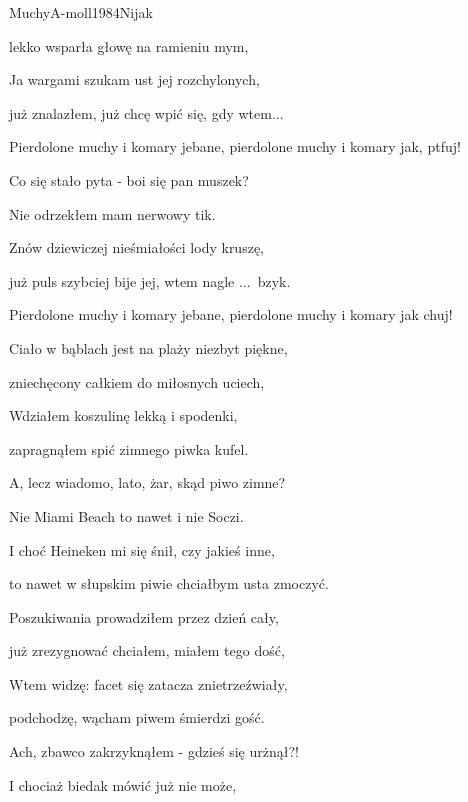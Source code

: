 \begin{song}{Muchy}{A-moll}{1984}{Nijak}{}{}
\begin{SBVerse}
	lekko wsparła głowę na ramieniu mym,

	Ja wargami szukam ust jej rozchylonych,

	już znalazłem, już chcę wpić się, gdy wtem...
	\end{SBVerse}

	\begin{SBChorus}
	Pierdolone muchy i komary jebane, pierdolone muchy i komary jak, ptfuj!
	\end{SBChorus}

	\begin{SBVerse}
	Co się stało pyta - boi się pan muszek?

	Nie odrzekłem mam nerwowy tik.

	Znów dziewiczej nieśmiałości lody kruszę,

	już puls szybciej bije jej, wtem nagle ...~bzyk.
	\end{SBVerse}

	\begin{SBChorus}
	Pierdolone muchy i komary jebane, pierdolone muchy i komary jak chuj!
	\end{SBChorus}

	\begin{SBVerse}
	Ciało w bąblach jest na plaży niezbyt piękne,

	zniechęcony całkiem do miłosnych uciech,

	Wdziałem koszulinę lekką i spodenki,

	zapragnąłem spić zimnego piwka kufel.
	\end{SBVerse}
	\begin{SBVerse}
	A, lecz wiadomo, lato, żar, skąd piwo zimne?

	Nie Miami Beach to nawet i nie Soczi.

	I choć Heineken mi się śnił, czy jakieś inne,

	to nawet w słupskim piwie chciałbym usta zmoczyć.
	\end{SBVerse}
	\begin{SBVerse}
	Poszukiwania prowadziłem przez dzień cały,

	już zrezygnować chciałem, miałem tego dość,

	Wtem widzę: facet się zatacza znietrzeźwiały,

	podchodzę, wącham piwem śmierdzi gość.
	\end{SBVerse}
	\begin{SBVerse}
	Ach, zbawco zakrzyknąłem - gdzieś się urżnął?!

	I chociaż biedak mówić już nie może,


\end{SBVerse}
\end{song}
